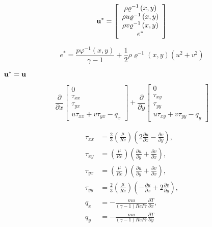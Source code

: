 \documentclass{article}
\begin{document}
\begin{equation} {\bf u}^* = \left[\begin{array}{c} \rho \varrho^{-1}\left(x,y\right) \\ \rho u \varrho^{-1}\left(x,y\right) \\ \rho v \varrho^{-1}\left(x,y\right) \\ e^* \end{array}\right] \end{equation}
\pagebreak

\begin{equation} e^* = \frac{p \varphi^{-1}\left(x,y\right)}{\gamma-1} + \frac{1}{2}\rho \varrho^{-1}\left(x,y\right) \left(u^2+v^2\right) \end{equation}
\pagebreak

${\bf u}^* = {\bf u}$
\pagebreak

\begin{equation} \frac {\partial} {\partial x} \left[\begin{array}{c} 0 \\ \tau_{xx} \\ \tau_{yx} \\ u \tau_{xx} + v \tau_{yx} - q_x \end{array}\right] + \frac {\partial} {\partial y} \left[\begin{array}{c} 0 \\ \tau_{xy} \\ \tau_{yy} \\ u \tau_{xy} + v \tau_{yy} - q_y \end{array}\right] \end{equation}
\pagebreak

\begin{align} \tau_{xx} &= \frac{2}{3}\left(\frac{\mu}{Re}\right)\left(2\frac{\partial u}{\partial x} - \frac{\partial v}{\partial y}\right),\\ \tau_{xy} &= \left(\frac{\mu}{Re}\right)\left(\frac{\partial u}{\partial y} + \frac{\partial v}{\partial x}\right),\\ \tau_{yx} &= \left(\frac{\mu}{Re}\right)\left(\frac{\partial u}{\partial y} + \frac{\partial v}{\partial x}\right),\\ \tau_{yy} &= \frac{2}{3}\left(\frac{\mu}{Re}\right)\left(-\frac{\partial u}{\partial x} +2\frac{\partial v}{\partial y}\right),\\ q_x &= -\frac{mu}{\left(\gamma-1\right)Re Pr}\frac{\partial T}{\partial x}, \\ q_y &= -\frac{mu}{\left(\gamma-1\right)Re Pr}\frac{\partial T}{\partial y} \end{align}
\pagebreak
\end{document}
